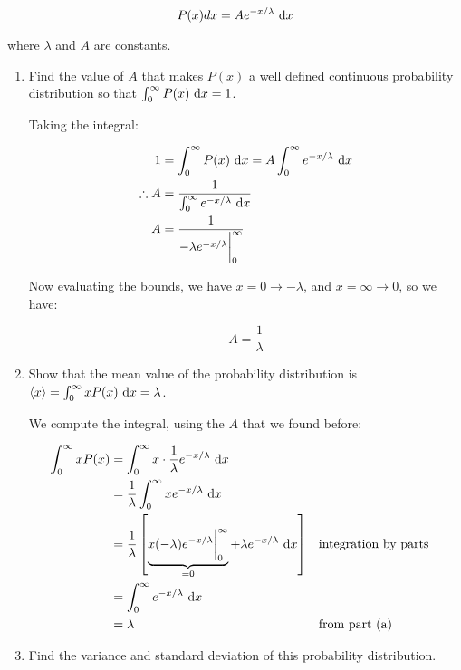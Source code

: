 \documentclass{article}
\begin{document}
\[ P(x) dx = Ae^{-x/\lambda} \ \mathrm d x\]

where $\lambda$ and $A$ are constants. 

\begin{enumerate}[label = (\alph*)]
    \item Find the value of $A$ that makes $P(x)$ a well defined continuous probability distribution so that $\int_0^\infty P(x) \ \mathrm d x = 1$. 
    
    \begin{solution}
        Taking the integral:

        \begin{align*}
            1 &= \int_0^\infty P(x) \ \mathrm d x = A \int_0^\infty e^{-x/\lambda} \ \mathrm d x\\
            \therefore A &= \frac{1}{\int_0^\infty e^{-x/\lambda } \ \mathrm d x}\\
            A &= \frac{1}{-\lambda e^{-x/\lambda}\bigg|_0^\infty}
        \end{align*}

        Now evaluating the bounds, we have $x = 0 \rightarrow -\lambda$, and $x = \infty \rightarrow 0$, so we have:

        \[ A = \frac{1}{\lambda}\]

            
    \end{solution}

    \item Show that the mean value of the probability distribution is $\langle x \rangle = \int_0^\infty xP(x) \ \mathrm d x = \lambda$. 

    \begin{solution}
        We compute the integral, using the $A$ that we found before:

        \begin{align*}
            \int_0^\infty xP(x) &= \int_0^\infty x \cdot \frac{1}{\lambda}e^{-x/\lambda} \ \mathrm d x\\
            &= \frac{1}{\lambda} \int_0^\infty xe^{-x/\lambda} \ \mathrm d x\\
            &= \frac{1}{\lambda}\left[\underbrace{x(-\lambda) e^{-x/\lambda} \bigg|_0^\infty}_{= 0} + \lambda e^{-x/\lambda} \ \mathrm d x\right] && \text{integration by parts}\\
            &= \int_0^\infty e^{-x/\lambda} \ \mathrm d x \\
            &= \lambda && \text{from part (a)}
        \end{align*}
    \end{solution}


    \item Find the variance and standard deviation of this probability distribution.
    

\end{enumerate}
\end{document}
